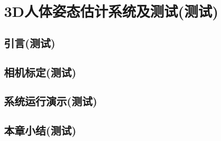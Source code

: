 
\chapter{3D人体姿态估计系统及测试(测试)}

\section{引言(测试)}

\section{相机标定(测试)}

\section{系统运行演示(测试)}

\section{本章小结(测试)}
